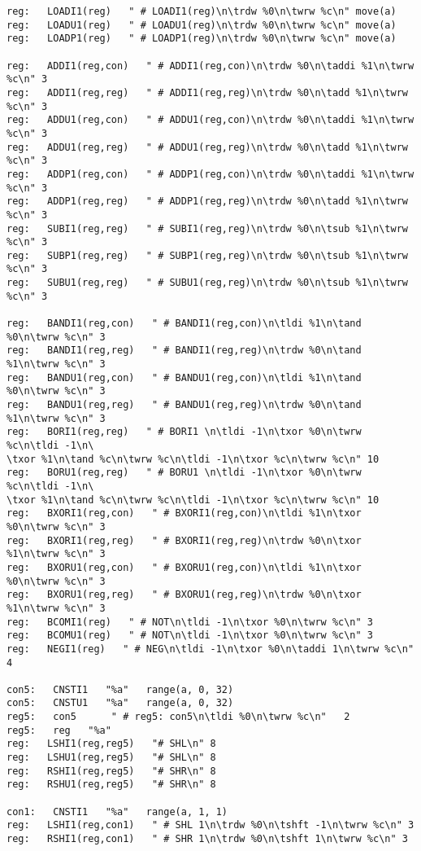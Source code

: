 {\begin{verbatim}
reg:   LOADI1(reg)   " # LOADI1(reg)\n\trdw %0\n\twrw %c\n" move(a)
reg:   LOADU1(reg)   " # LOADU1(reg)\n\trdw %0\n\twrw %c\n" move(a)
reg:   LOADP1(reg)   " # LOADP1(reg)\n\trdw %0\n\twrw %c\n" move(a)

reg:   ADDI1(reg,con)   " # ADDI1(reg,con)\n\trdw %0\n\taddi %1\n\twrw %c\n" 3
reg:   ADDI1(reg,reg)   " # ADDI1(reg,reg)\n\trdw %0\n\tadd %1\n\twrw %c\n" 3
reg:   ADDU1(reg,con)   " # ADDU1(reg,con)\n\trdw %0\n\taddi %1\n\twrw %c\n" 3
reg:   ADDU1(reg,reg)   " # ADDU1(reg,reg)\n\trdw %0\n\tadd %1\n\twrw %c\n" 3
reg:   ADDP1(reg,con)   " # ADDP1(reg,con)\n\trdw %0\n\taddi %1\n\twrw %c\n" 3
reg:   ADDP1(reg,reg)   " # ADDP1(reg,reg)\n\trdw %0\n\tadd %1\n\twrw %c\n" 3
reg:   SUBI1(reg,reg)   " # SUBI1(reg,reg)\n\trdw %0\n\tsub %1\n\twrw %c\n" 3
reg:   SUBP1(reg,reg)   " # SUBP1(reg,reg)\n\trdw %0\n\tsub %1\n\twrw %c\n" 3
reg:   SUBU1(reg,reg)   " # SUBU1(reg,reg)\n\trdw %0\n\tsub %1\n\twrw %c\n" 3

reg:   BANDI1(reg,con)   " # BANDI1(reg,con)\n\tldi %1\n\tand %0\n\twrw %c\n" 3
reg:   BANDI1(reg,reg)   " # BANDI1(reg,reg)\n\trdw %0\n\tand %1\n\twrw %c\n" 3
reg:   BANDU1(reg,con)   " # BANDU1(reg,con)\n\tldi %1\n\tand %0\n\twrw %c\n" 3
reg:   BANDU1(reg,reg)   " # BANDU1(reg,reg)\n\trdw %0\n\tand %1\n\twrw %c\n" 3
reg:   BORI1(reg,reg)   " # BORI1 \n\tldi -1\n\txor %0\n\twrw %c\n\tldi -1\n\
\txor %1\n\tand %c\n\twrw %c\n\tldi -1\n\txor %c\n\twrw %c\n" 10
reg:   BORU1(reg,reg)   " # BORU1 \n\tldi -1\n\txor %0\n\twrw %c\n\tldi -1\n\
\txor %1\n\tand %c\n\twrw %c\n\tldi -1\n\txor %c\n\twrw %c\n" 10
reg:   BXORI1(reg,con)   " # BXORI1(reg,con)\n\tldi %1\n\txor %0\n\twrw %c\n" 3
reg:   BXORI1(reg,reg)   " # BXORI1(reg,reg)\n\trdw %0\n\txor %1\n\twrw %c\n" 3
reg:   BXORU1(reg,con)   " # BXORU1(reg,con)\n\tldi %1\n\txor %0\n\twrw %c\n" 3
reg:   BXORU1(reg,reg)   " # BXORU1(reg,reg)\n\trdw %0\n\txor %1\n\twrw %c\n" 3
reg:   BCOMI1(reg)   " # NOT\n\tldi -1\n\txor %0\n\twrw %c\n" 3
reg:   BCOMU1(reg)   " # NOT\n\tldi -1\n\txor %0\n\twrw %c\n" 3
reg:   NEGI1(reg)   " # NEG\n\tldi -1\n\txor %0\n\taddi 1\n\twrw %c\n" 4

con5:   CNSTI1   "%a"   range(a, 0, 32)
con5:   CNSTU1   "%a"   range(a, 0, 32)
reg5:   con5      " # reg5: con5\n\tldi %0\n\twrw %c\n"   2
reg5:   reg   "%a"
reg:   LSHI1(reg,reg5)   "# SHL\n" 8
reg:   LSHU1(reg,reg5)   "# SHL\n" 8
reg:   RSHI1(reg,reg5)   "# SHR\n" 8
reg:   RSHU1(reg,reg5)   "# SHR\n" 8

con1:   CNSTI1   "%a"   range(a, 1, 1)
reg:   LSHI1(reg,con1)   " # SHL 1\n\trdw %0\n\tshft -1\n\twrw %c\n" 3
reg:   RSHI1(reg,con1)   " # SHR 1\n\trdw %0\n\tshft 1\n\twrw %c\n" 3


\end{verbatim}}
